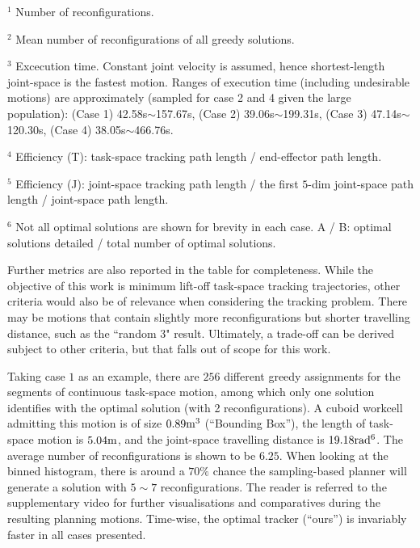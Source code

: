 \documentclass[letterpaper, 10 pt, conference]{ieeeconf}  %
\begin{document}
\begin{table}[t]
\begin{tabular}{c|c|c|c|c|c|c|c|c}
\\
\hline
\end{tabular}
\begin{tablenotes}[t]
\item $^1$ Number of reconfigurations. 
\item $^2$ Mean number of reconfigurations of all greedy solutions. 
\item $^3$ Excecution time. Constant joint velocity is assumed, hence shortest-length joint-space is the fastest motion. Ranges of execution time (including undesirable motions) are approximately (sampled for case 2 and 4 given the large population): (Case 1) 42.58s$\sim$157.67s, (Case 2) 39.06s$\sim$199.31s, (Case 3) 47.14s$\sim$120.30s, (Case 4) 38.05s$\sim$466.76s.
\item $^4$ Efficiency (T): task-space tracking path length / end-effector path length.
\item $^5$ Efficiency (J): joint-space tracking path length / the first $5$-dim joint-space path length / joint-space path length. 
\item $^6$ Not all optimal solutions are shown for brevity in each case. A / B: optimal solutions detailed /  total number of optimal solutions. 
\end{tablenotes}
\vspace{-0.5cm}
\end{table}



Further metrics are also reported in the table for completeness. While the objective of this work is minimum lift-off task-space tracking trajectories, other criteria would also 
be of relevance when considering the tracking problem. %
There may be motions that contain slightly more reconfigurations but shorter travelling distance, such as the ``random 3"  result. 
Ultimately, a trade-off can be derived subject to other criteria, but that falls out of scope for this work. 

Taking  case $1$ as an example, there are $256$ different greedy assignments for the segments of continuous task-space motion, among which only one solution identifies with the 
optimal solution (with 2 reconfigurations). 
A cuboid workcell admitting this motion is of size ${\rm 0.89m^3}$ (``Bounding Box''), the length of task-space motion is ${\rm 5.04m}$, and the joint-space travelling distance is 
${\rm 19.18rad^6}$. %
The average number of reconfigurations is shown to be $6.25$. When looking at the binned histogram, there is around a $70\%$ chance the sampling-based planner will generate a solution with $5\sim7$ reconfigurations. %
The reader is referred to the supplementary video for further visualisations and comparatives during the resulting planning motions. Time-wise, the optimal tracker (``ours'') is invariably faster in all cases presented.
\end{document}
